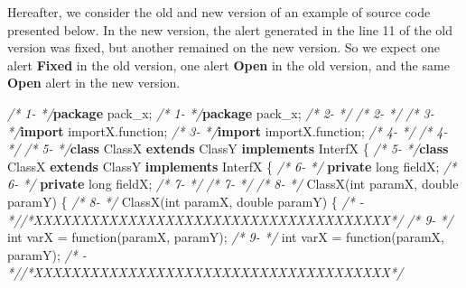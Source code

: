 \documentclass[
]{article}
\newenvironment{Shaded}{\begin{snugshade}}{\end{snugshade}}
\newcommand{\CommentTok}[1]{\textcolor[rgb]{0.56,0.35,0.01}{\textit{#1}}}
\newcommand{\DataTypeTok}[1]{\textcolor[rgb]{0.13,0.29,0.53}{#1}}
\newcommand{\FunctionTok}[1]{\textcolor[rgb]{0.00,0.00,0.00}{#1}}
\newcommand{\ImportTok}[1]{#1}
\newcommand{\KeywordTok}[1]{\textcolor[rgb]{0.13,0.29,0.53}{\textbf{#1}}}
\newcommand{\NormalTok}[1]{#1}
\begin{document}
Hereafter, we consider the old and new version of an example of source
code presented below. In the new version, the alert generated in the
line 11 of the old version was fixed, but another remained on the new
version. So we expect one alert \textbf{Fixed} in the old version, one
alert \textbf{Open} in the old version, and the same \textbf{Open} alert
in the new version.

\scriptsize

\begin{Shaded}
\begin{Highlighting}[]
\CommentTok{/*  1-   */}\KeywordTok{package}\ImportTok{ pack_x;                                          \CommentTok{/*  1-   */}\KeywordTok{package} pack_x;}                                          
\CommentTok{/*  2-   */}                                                         \CommentTok{/*  2-   */}                                                         
\CommentTok{/*  3-   */}\KeywordTok{import}\ImportTok{ importX.function;                                 \CommentTok{/*  3-   */}\KeywordTok{import} importX.function;}                                 
\CommentTok{/*  4-   */}                                                         \CommentTok{/*  4-   */}                                                         
\CommentTok{/*  5-   */}\KeywordTok{class}\NormalTok{ ClassX }\KeywordTok{extends}\NormalTok{ ClassY }\KeywordTok{implements}\NormalTok{ InterfX \{         }\CommentTok{/*  5-   */}\KeywordTok{class}\NormalTok{ ClassX }\KeywordTok{extends}\NormalTok{ ClassY }\KeywordTok{implements}\NormalTok{ InterfX \{         }
\CommentTok{/*  6-   */}    \KeywordTok{private} \DataTypeTok{long}\NormalTok{ fieldX;                                 }\CommentTok{/*  6-   */}    \KeywordTok{private} \DataTypeTok{long}\NormalTok{ fieldX;                                 }
\CommentTok{/*  7-   */}                                                         \CommentTok{/*  7-   */}                                                         
\CommentTok{/*  8-   */}    \FunctionTok{ClassX}\NormalTok{(}\DataTypeTok{int}\NormalTok{ paramX, }\DataTypeTok{double}\NormalTok{ paramY) \{                  }\CommentTok{/*  8-   */}    \FunctionTok{ClassX}\NormalTok{(}\DataTypeTok{int}\NormalTok{ paramX, }\DataTypeTok{double}\NormalTok{ paramY) \{                  }
\CommentTok{/*   -   *//*XXXXXXXXXXXXXXXXXXXXXXXXXXXXXXXXXXXXXX*/}               \CommentTok{/*  9-   */}        \DataTypeTok{int}\NormalTok{ varX = }\FunctionTok{function}\NormalTok{(paramX, paramY);                  }
\CommentTok{/*  9-   */}        \DataTypeTok{int}\NormalTok{ varX = }\FunctionTok{function}\NormalTok{(paramX, paramY);             }\CommentTok{/*   -   *//*XXXXXXXXXXXXXXXXXXXXXXXXXXXXXXXXXXXXXX*/}               

\end{Highlighting}
\end{Shaded}
\end{document}
